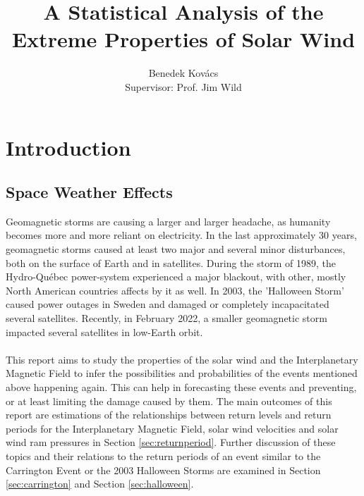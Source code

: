 \documentclass[12pt]{article}
\title{\vspace{-2em}A Statistical Analysis of the Extreme Properties of Solar Wind}
\author{Benedek Kovács\\ Supervisor: Prof. Jim Wild}
\date{}
\begin{document}
\maketitle
\begin{center}
\end{center}
\bigskip
\begin{abstract}
    
\end{abstract}
\newpage
\restoregeometry
\tableofcontents
\newpage
{}

\section{Introduction}\label{sec:introduction}
    \subsection{Space Weather Effects}\label{sec:spaceweather}
        Geomagnetic storms are causing a larger and larger headache, as humanity becomes more and more reliant on electricity. In the last approximately 30 years, geomagnetic storms caused at least two major and several minor disturbances, both on the surface of Earth and in satellites. During the storm of 1989, the Hydro-Québec power-system experienced a major blackout, with other, mostly North American countries affects by it as well\cite{1989hydroquebec}. In 2003, the 'Halloween Storm' \cite{2003halloweensweden} caused power outages in Sweden and damaged or completely incapacitated several satellites. Recently, in February 2022, a smaller geomagnetic storm impacted several satellites in low-Earth orbit\cite{2022spacex}.\\ \\
        This report aims to study the properties of the solar wind and the Interplanetary Magnetic Field to infer the possibilities and probabilities of the events mentioned above happening again. This can help in forecasting these events and preventing, or at least limiting the damage caused by them. The main outcomes of this report are estimations of the relationships between return levels and return periods for the Interplanetary Magnetic Field, solar wind velocities and solar wind ram pressures in Section \ref{sec:returnperiod}. Further discussion of these topics and their relations to the return periods of an event similar to the Carrington Event or the 2003 Halloween Storms are examined in Section \ref{sec:carrington} and Section \ref{sec:halloween}.
\end{document}
